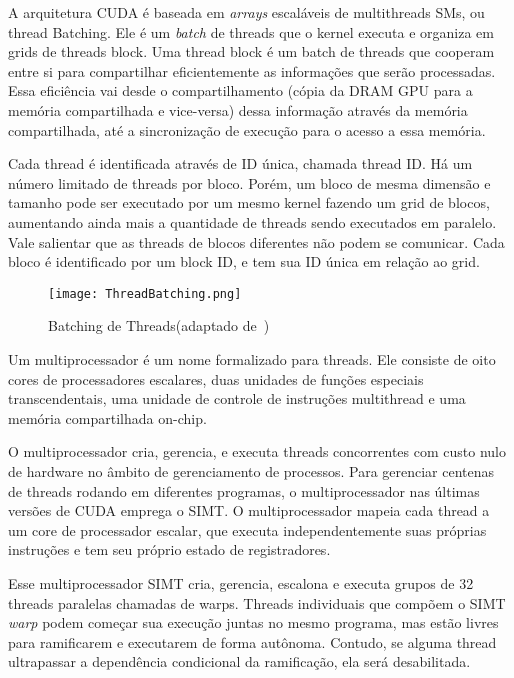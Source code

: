 A arquitetura CUDA é baseada em \textit{arrays} escaláveis de multithreads SMs, ou thread Batching. Ele é um \textit{batch} de threads que o kernel executa e organiza em grids de threads block. Uma thread block é um batch de threads que cooperam entre si para compartilhar eficientemente as informações que serão processadas. Essa eficiência vai desde o compartilhamento (cópia da DRAM GPU para a memória compartilhada e vice-versa) dessa informação através da memória compartilhada, até a sincronização de execução para o acesso a essa memória.

Cada thread é identificada através de ID única, chamada thread ID. Há um número limitado de threads por bloco. Porém, um bloco de mesma dimensão e tamanho pode ser executado por um mesmo kernel fazendo um grid de blocos, aumentando ainda mais a quantidade de threads sendo executados em paralelo. Vale salientar que as threads de blocos diferentes não podem se comunicar.
Cada bloco é identificado por um block ID, e tem sua ID única em relação ao grid.

\begin{figure}[!htb]
	\begin{center}
	\centering
			\texttt{[image: ThreadBatching.png]}
	\label{fig: ThreadBatching}
	\caption{Batching de Threads(adaptado de~\citep{cuda})}
	\end{center}
\end{figure}

Um multiprocessador é um nome formalizado para threads. Ele consiste de oito cores de processadores escalares, duas unidades de funções especiais transcendentais, uma unidade de controle de instruções multithread e uma memória compartilhada on-chip.

O multiprocessador cria, gerencia, e executa threads concorrentes com custo nulo de hardware no âmbito de gerenciamento de processos. Para gerenciar centenas de threads rodando em diferentes programas, o multiprocessador nas últimas versões de CUDA emprega o SIMT. O multiprocessador mapeia cada thread a um core de processador escalar, que executa independentemente suas próprias instruções e tem seu próprio estado de registradores.

Esse multiprocessador SIMT cria, gerencia, escalona e executa grupos de 32 threads paralelas chamadas de warps. Threads individuais que compõem o SIMT \textit{warp} podem começar sua execução juntas no mesmo programa, mas estão livres para ramificarem e executarem de forma autônoma. Contudo, se alguma thread ultrapassar a dependência condicional da ramificação, ela será desabilitada. 

